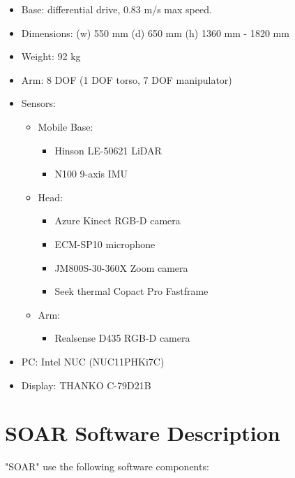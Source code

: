 \begin{itemize}
	\item Base: differential drive, 0.83 m/s max speed.
	\item Dimensions: (w) 550 mm (d) 650 mm (h) 1360 mm - 1820 mm
	\item Weight: 92 kg
	\item Arm: 8 DOF (1 DOF torso, 7 DOF manipulator)
	\item Sensors:
	      \begin{itemize}
		      \item Mobile Base:
		            \begin{itemize}
			            \item Hinson LE-50621 LiDAR
			            \item N100 9-axis IMU
		            \end{itemize}
		      \item Head:
		            \begin{itemize}
			            \item Azure Kinect RGB-D camera
			            \item ECM-SP10 microphone
			            \item JM800S-30-360X Zoom camera
			            \item Seek thermal Copact Pro Fastframe
		            \end{itemize}
		      \item Arm:
		            \begin{itemize}
			            \item Realsense D435 RGB-D camera
		            \end{itemize}
	      \end{itemize}
	\item PC: Intel NUC (NUC11PHKi7C)
	\item Display: THANKO C-79D21B
\end{itemize}

\section*{SOAR Software Description}

"SOAR" use the following software components:

